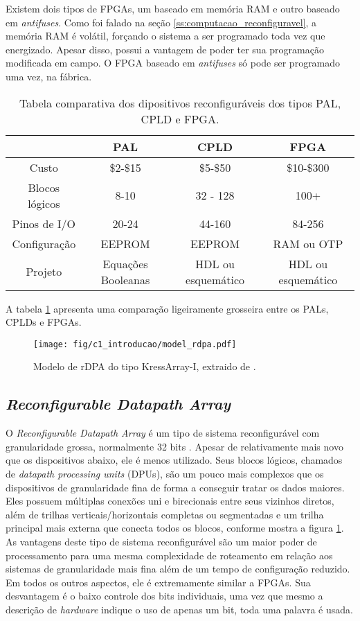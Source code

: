 \documentclass[11pt,a4paper,oneside]{book}
\begin{document}
Existem dois tipos de FPGAs, um baseado em mem\'oria RAM e outro baseado em \textit{antifuses}.
Como foi falado na se\c{c}\~ao \ref{ss:computacao_reconfiguravel}, a mem\'oria RAM \'e vol\'atil, for\c{c}ando o sistema a ser programado toda vez que energizado.
Apesar disso, possui a vantagem de poder ter sua programa\c{c}\~ao modificada em campo.
O FPGA baseado em \textit{antifuses} s\'o pode ser programado uma vez, na f\'abrica.

\begin{table}[h]
\centering
\begin{tabular}{|c|c|c|c|}
\hline
 & PAL & CPLD & FPGA \\ \hline
Custo & \$2-\$15 & \$5-\$50 & \$10-\$300 \\ \hline
Blocos l\'ogicos & 8-10 & 32 - 128 & 100+ \\ \hline
Pinos de I/O & 20-24 & 44-160 & 84-256\\ \hline
Configura\c{c}\~ao & EEPROM & EEPROM & RAM ou OTP\\ \hline
Projeto & Equa\c{c}\~oes Booleanas & HDL ou esquem\'atico & HDL ou esquem\'atico\\ \hline
\end{tabular}
\caption{Tabela comparativa dos dipositivos reconfigur\'aveis dos tipos PAL, CPLD e FPGA.}
\label{tab:comparacao}
\end{table}

A tabela \ref{tab:comparacao} apresenta uma compara\c{c}\~ao ligeiramente grosseira entre os PALs, CPLDs e FPGAs.

\begin{figure}[h]
\centering
\texttt{[image: fig/c1\_introducao/model\_rdpa.pdf]}
\caption{Modelo de rDPA do tipo KressArray-I, extraido de \cite{Hartenstein1995}.}
\label{fig:kressarray}
\end{figure}

\subsection{\textit{Reconfigurable Datapath Array}}
O \textit{Reconfigurable Datapath Array} \'e um tipo de sistema reconfigur\'avel com granularidade grossa, normalmente 32 bits \cite{Hartenstein2001}.
Apesar de relativamente mais novo que os dispositivos abaixo, ele \'e menos utilizado.
Seus blocos l\'ogicos, chamados de \textit{datapath processing units} (DPUs), s\~ao um pouco mais complexos que os dispositivos de granularidade fina de forma a conseguir tratar os dados maiores.
Eles possuem m\'ultiplas conex\~oes uni e birecionais entre seus vizinhos diretos, al\'em de trilhas verticais/horizontais completas ou segmentadas e um trilha principal mais externa que conecta todos os blocos, conforme mostra a figura \ref{fig:kressarray}.
As vantagens deste tipo de sistema reconfigur\'avel s\~ao um maior poder de processamento para uma mesma complexidade de roteamento em rela\c{c}\~ao aos sistemas de granularidade mais fina al\'em de um tempo de configura\c{c}\~ao reduzido.
Em todos os outros aspectos, ele \'e extremamente similar a FPGAs.
Sua desvantagem \'e o baixo controle dos bits individuais, uma vez que mesmo a descri\c{c}\~ao de \textit{hardware} indique o uso de apenas um bit, toda uma palavra \'e usada.
\end{document}
